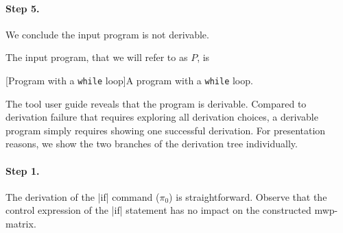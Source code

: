 \begin{example}
\paragraph*{Step 5.} We conclude the input program is not derivable.
\end{example}

\begin{example}\label{ex:while1}
The input program, that we will refer to as \(P\), is

\begin{center}
\begin{minipage}{\textwidth}
\captionsetup{type=lstlisting}
[Program with a \texttt{while} loop]{A program with a \texttt{while} loop.}
\label{lst:ex-notinfinite3}
\end{minipage}
\end{center}

The tool user guide reveals that the program is derivable.
Compared to derivation failure that requires exploring all derivation choices,
a derivable program simply requires showing one successful derivation.
For presentation reasons, we show the two branches of the derivation tree individually.

\paragraph*{Step 1.} The derivation of the \pr|if| command (\(\pi_0\)){ }is straightforward.
Observe that the control expression of the \pr|if| statement has no impact on the constructed mwp-matrix.


\end{example}
